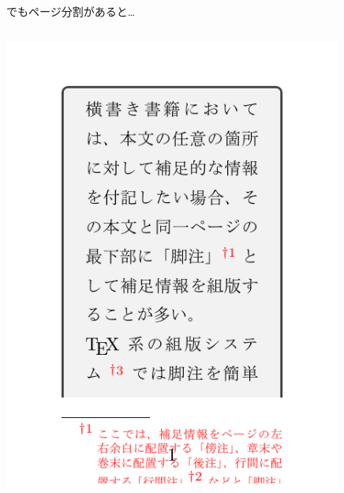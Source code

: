 \documentclass[unicode,14pt]{beamer}
\begin{document}
\begin{frame}[t]{でもページ分割があると…}
\begin{columns}
\begin{column}{0.45\textwidth}
\colorbox{white}{\includegraphics[width=0.9\textwidth, page=1]{codes/history5.pdf}}
\end{column}
\begin{column}{0.45\textwidth}

\end{column}
\end{columns}
\end{frame}
\end{document}
